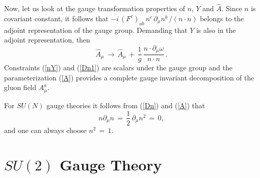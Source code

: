 \documentclass[a4paper,a4paper]{article}
\begin{document}
Now, let us look at the gauge transformation properties of $n$, $Y$ and 
$\hat{A}$. Since $n$ is covariant constant, it follows that 
$ -i \, \left( F^c \right)_{ab} \, n^c \, \partial_\mu n^b \, / 
(n \cdot n)$ belongs to the adjoint representation of the gauge group. 
Demanding that $Y$ is also in the adjoint representation, then
\begin{equation}
   \hat{A}_\mu \, \longrightarrow \, \hat{A}_\mu \, + \,
                                     \frac{1}{g} \, 
                                         \frac{n \cdot \partial_\mu \omega}
                                              {n \cdot n} \, .
\end{equation}
Constraints (\ref{nY}) and (\ref{Dn1}) are scalars under the gauge group and
the parameterization (\ref{A}) provides a complete gauge invariant 
decomposition of the gluon field $A^a_\mu$.

For $SU(N)$ gauge theories it follows from (\ref{Dn}) and (\ref{A}) that
\begin{equation}
    n \partial_\mu n \, = \, \frac{1}{2} \, \partial_\mu n^2 \, = \, 0,
   \label{t1}
\end{equation}
and one can always choose $n^2 \, = \, 1$.


\section{$SU(2)$ Gauge Theory}
\end{document}
